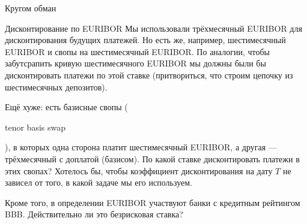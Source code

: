 \documentclass{beamer}
\newcommand{\en}[1]{\begin{otherlanguage}{english}#1\end{otherlanguage}}
\begin{document}
\begin{frame}{Кругом обман}
\centering
{}
\end{frame}



\begin{frame}{Дисконтирование по EURIBOR}
\justify
Мы использовали трёхмесячный EURIBOR для дисконтирования будущих платежей. Но есть же, например, шестимесячный EURIBOR и свопы на шестимесячный EURIBOR. По аналогии, чтобы забутсрапить кривую шестимесячного EURIBOR мы должны были бы дисконтировать платежи по этой ставке (притвориться, что строим цепочку из шестимесячных депозитов).

\justify
Ещё хуже: есть базисные свопы (\en{tenor basis swap}), в которых одна сторона платит шестимесячный EURIBOR, а другая --- трёхмесячный с доплатой (базисом). По какой ставке  дисконтировать платежи в этих свопах? Хотелось бы, чтобы коэффициент дисконтирования на дату $T$ не зависел от того, в какой задаче мы его используем.

\justify
Кроме того, в определении EURIBOR участвуют банки с кредитным рейтингом BBB. Действительно ли это безрисковая ставка?
\end{frame}
\end{document}
